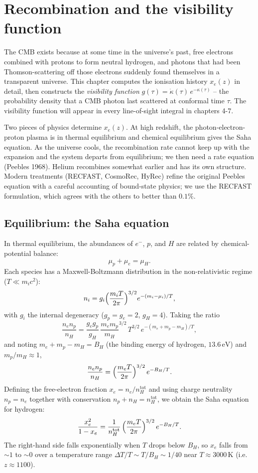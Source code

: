 \section{Recombination and the visibility function}
\label{ch:recomb}

The CMB exists because at some time in the universe's past, free electrons combined with protons to form neutral hydrogen, and photons that had been Thomson-scattering off those electrons suddenly found themselves in a transparent universe. This chapter computes the ionisation history $x_e(z)$ in detail, then constructs the \emph{visibility function} $g(\tau) = \dot\kappa(\tau)\, e^{-\kappa(\tau)}$ -- the probability density that a CMB photon last scattered at conformal time $\tau$. The visibility function will appear in every line-of-sight integral in chapters 4-7.

Two pieces of physics determine $x_e(z)$. At high redshift, the photon-electron-proton plasma is in thermal equilibrium and chemical equilibrium gives the Saha equation. As the universe cools, the recombination rate cannot keep up with the expansion and the system departs from equilibrium; we then need a rate equation (Peebles 1968). Helium recombines somewhat earlier and has its own structure. Modern treatments (RECFAST, CosmoRec, HyRec) refine the original Peebles equation with a careful accounting of bound-state physics; we use the RECFAST formulation, which agrees with the others to better than $0.1\%$.

\subsection{Equilibrium: the Saha equation}

In thermal equilibrium, the abundances of $e^-$, $p$, and $H$ are related by chemical-potential balance:
\[
  \mu_p + \mu_e = \mu_H.
\]
Each species has a Maxwell-Boltzmann distribution in the non-relativistic regime ($T \ll m_i c^2$):
\[
  n_i = g_i \Bigl(\frac{m_i T}{2\pi}\Bigr)^{3/2} e^{-(m_i - \mu_i)/T},
\]
with $g_i$ the internal degeneracy ($g_p = g_e = 2$, $g_H = 4$). Taking the ratio
\[
  \frac{n_e n_p}{n_H} = \frac{g_e g_p}{g_H}\, \frac{m_e m_p}{m_H}^{3/2}\, T^{3/2}\, e^{-(m_e + m_p - m_H)/T},
\]
and noting $m_e + m_p - m_H = B_H$ (the binding energy of hydrogen, $13.6\,\mathrm{eV}$) and $m_p/m_H \approx 1$,
\[
  \frac{n_e n_p}{n_H} = \Bigl(\frac{m_e T}{2\pi}\Bigr)^{3/2}\, e^{-B_H/T}.
\]
Defining the free-electron fraction $x_e = n_e/n_H^\mathrm{tot}$ and using charge neutrality $n_p = n_e$ together with conservation $n_p + n_H = n_H^\mathrm{tot}$, we obtain the Saha equation for hydrogen:
\begin{equation}
  \frac{x_e^2}{1 - x_e} = \frac{1}{n_H^\mathrm{tot}}\,\Bigl(\frac{m_e T}{2\pi}\Bigr)^{3/2}\, e^{-B_H/T}.
  \label{eq:Saha_H}
\end{equation}
The right-hand side falls exponentially when $T$ drops below $B_H$, so $x_e$ falls from $\sim 1$ to $\sim 0$ over a temperature range $\Delta T/T \sim T/B_H \sim 1/40$ near $T \approx 3000\,\mathrm{K}$ (i.e.\ $z \approx 1100$).

